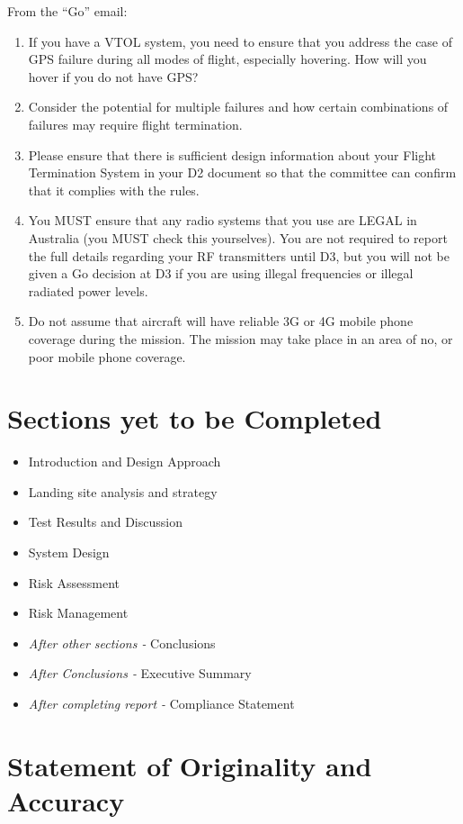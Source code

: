 \documentclass{article}
\begin{document}
From the ``Go'' email:
\begin{enumerate}
	\item If you have a VTOL system, you need to ensure that you address the case of GPS failure during all modes of flight, especially hovering. How will you hover if you do not have GPS?
	\item Consider the potential for multiple failures and how certain combinations of failures may require flight termination.
	\item Please ensure that there is sufficient design information about your Flight Termination System in your D2 document so that the committee can confirm that it complies with the rules.
	\item You MUST ensure that any radio systems that you use are LEGAL in Australia (you MUST check this yourselves). You are not required to report the full details regarding your RF transmitters until D3, but you will not be given a Go decision at D3 if you are using illegal frequencies or illegal radiated power levels.
	\item Do not assume that aircraft will have reliable 3G or 4G mobile phone coverage during the mission. The mission may take place in an area of no, or poor mobile phone coverage.
\end{enumerate}

\section{Sections yet to be Completed}
\begin{itemize}
	\item Introduction and Design Approach
	\item Landing site analysis and strategy
	\item Test Results and Discussion
	\item System Design
	\item Risk Assessment
	\item Risk Management
	\item \textit{After other sections -} Conclusions
	\item \textit{After Conclusions -} Executive Summary
	\item \textit{After completing report -} Compliance Statement
\end{itemize}

\newpage

\section{Statement of Originality and Accuracy}

\end{document}
